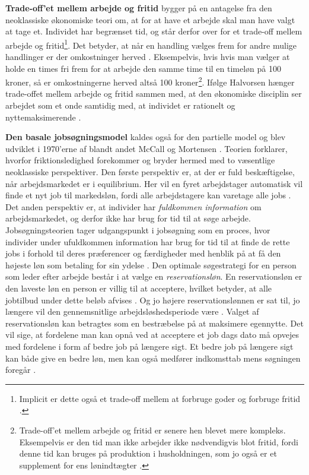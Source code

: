 \textbf{Trade-off'et mellem arbejde og fritid} bygger på en antagelse fra den neoklassiske økonomiske teori om, at for at have et arbejde skal man have valgt at tage et. Individet har begrænset tid, og står derfor over for et trade-off mellem arbejde og fritid\footnote{Implicit er dette også et trade-off mellem at forbruge goder og forbruge fritid \parencite[5]{Cahuc2004}.}. Det betyder, at når en handling vælges frem for andre mulige handlinger er der omkostninger herved \parencite[389]{Mankiw2011}. Eksempelvis, hvis hvis man vælger at holde en times fri frem for at arbejde den samme time til en timeløn på 100 kroner, så er omkostningerne herved altså 100 kroner\footnote{Trade-off'et mellem arbejde og fritid er senere hen blevet mere kompleks. Eksempelvis er den tid man ikke arbejder ikke nødvendigvis blot fritid, fordi denne tid kan bruges på produktion i husholdningen, som jo også er et supplement for ens lønindtægter \parencite[14]{Cahuc2004}.}. Ifølge Halvorsen hænger trade-offet mellem arbejde og fritid sammen med, at den økonomiske disciplin ser arbejdet som et onde samtidig med, at individet er rationelt og nyttemaksimerende \parencite[26]{Halvorsen1999}.

\textbf{Den basale jobsøgningsmodel} kaldes også for den partielle model og blev udviklet i 1970'erne af blandt andet McCall og Mortensen \parencite[109]{Cahuc2004}. Teorien forklarer, hvorfor friktionsledighed forekommer og bryder hermed med to væsentlige neoklassiske perspektiver. Den første perspektiv er, at der er fuld beskæftigelse, når arbejdsmarkedet er i equilibrium. Her vil en fyret arbejdstager automatisk vil finde et nyt job til markedsløn, fordi alle arbejdstagere kan varetage alle jobs \parencite[163]{Mankiw2007}. Det anden perspektiv er, at individer har \textit{fuldkommen information} om arbejdsmarkedet, og derfor ikke har brug for tid til at søge arbejde. Jobsøgningsteorien tager udgangspunkt i jobsøgning som en proces, hvor individer under ufuldkommen information har brug for tid til at finde de rette jobs i forhold til deres præferencer og færdigheder med henblik på at få den højeste løn som betaling for sin ydelse \parencite[108]{Cahuc2004}. Den optimale søgestrategi for en person som leder efter arbejde består i at vælge en \textit{reservationsløn}. En reservationsløn er den laveste løn en person er villig til at acceptere, hvilket betyder, at alle jobtilbud under dette beløb afvises \parencite[114]{McCall1970}. Og jo højere reservationslønnen er sat til, jo længere vil den gennemsnitlige arbejdsløshedsperiode være \parencite[848]{Mortensen1970}. Valget af reservationsløn kan betragtes som en bestræbelse på at maksimere egennytte. Det vil sige, at fordelene man kan opnå ved at acceptere et job dags dato må opvejes med fordelene i form af bedre job på længere sigt. Et bedre job på længere sigt kan både give en bedre løn, men kan også medfører indkomsttab mens søgningen foregår \parencite[1698]{Atkinson1991}.


